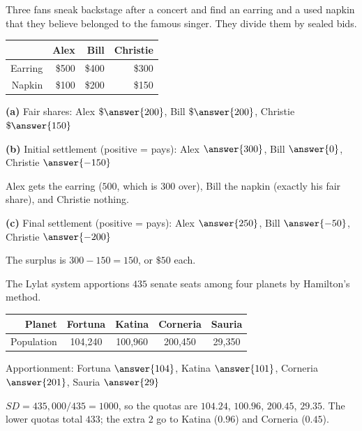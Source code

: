 \documentclass[12pt]{ximera}
\begin{document}
\begin{problem}
Three fans sneak backstage after a concert and find an earring and a used napkin that
they believe belonged to the famous singer. They divide them by sealed bids.
\begin{center}
\begin{tabular}{r|rrr}
 & Alex & Bill & Christie\\\hline
Earring & \$500 & \$400 & \$300\\
Napkin & \$100 & \$200 & \$150
\end{tabular}
\end{center}

\begin{prompt}
\textbf{(a)} Fair shares: Alex $\$\answer{200}$, Bill $\$\answer{200}$, Christie
$\$\answer{150}$
\end{prompt}

\begin{prompt}
\textbf{(b)} Initial settlement (positive = pays): Alex $\answer{300}$, Bill $\answer{0}$,
Christie $\answer{-150}$
\begin{feedback}
Alex gets the earring ($500$, which is $300$ over), Bill the napkin (exactly his fair
share), and Christie nothing.
\end{feedback}
\end{prompt}

\begin{prompt}
\textbf{(c)} Final settlement (positive = pays): Alex $\answer{250}$, Bill $\answer{-50}$,
Christie $\answer{-200}$
\begin{feedback}
The surplus is $300-150=150$, or $\$50$ each.
\end{feedback}
\end{prompt}
\end{problem}

\begin{problem}
The Lylat system apportions $435$ senate seats among four planets by Hamilton's method.
\begin{center}
\begin{tabular}{r|cccc}
Planet & Fortuna & Katina & Corneria & Sauria\\\hline
Population & 104,240 & 100,960 & 200,450 & 29,350
\end{tabular}
\end{center}
Apportionment: Fortuna $\answer{104}$, Katina $\answer{101}$, Corneria $\answer{201}$,
Sauria $\answer{29}$

\begin{feedback}
$SD=435{,}000/435=1000$, so the quotas are $104.24$, $100.96$, $200.45$, $29.35$. The
lower quotas total $433$; the extra $2$ go to Katina ($0.96$) and Corneria ($0.45$).
\end{feedback}
\end{problem}
\end{document}
